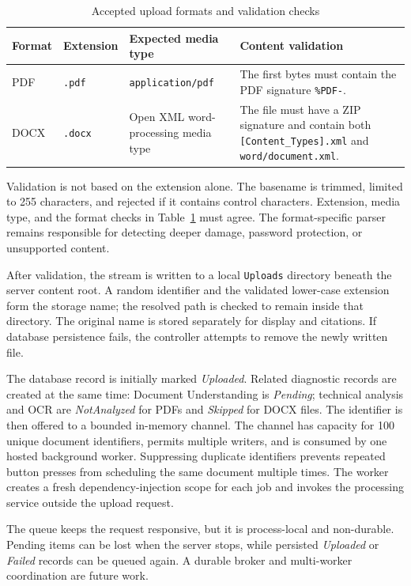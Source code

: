 \begin{table}[!htbp]
	\centering
	\small
	\caption{Accepted upload formats and validation checks}
	\label{tab:upload-formats}
	\begin{tabular}{@{}p{2.0cm}p{3.0cm}p{4.4cm}p{4.0cm}@{}}
		\toprule
		Format & Extension & Expected media type & Content validation \\
		\midrule
		PDF & \texttt{.pdf} & \texttt{application/pdf} & The first bytes must contain the PDF signature \texttt{\%PDF-}. \\
		DOCX & \texttt{.docx} & Open XML word-processing media type & The file must have a ZIP signature and contain both \texttt{[Content\_Types].xml} and \texttt{word/document.xml}. \\
		\bottomrule
	\end{tabular}
\end{table}

Validation is not based on the extension alone. The basename is trimmed,
limited to 255 characters, and rejected if it contains control characters.
Extension, media type, and the format checks in Table~\ref{tab:upload-formats}
must agree. The format-specific parser remains responsible for detecting
deeper damage, password protection, or unsupported content.

After validation, the stream is written to a local \texttt{Uploads} directory
beneath the server content root. A random identifier and the validated
lower-case extension form the storage name; the resolved path is checked to
remain inside that directory. The original name is stored separately for
display and citations. If database persistence fails, the controller attempts
to remove the newly written file.

The database record is initially marked \emph{Uploaded}. Related diagnostic
records are created at the same time: Document Understanding is \emph{Pending};
technical analysis and OCR are \emph{NotAnalyzed} for PDFs and \emph{Skipped}
for DOCX files. The identifier is then offered to a bounded in-memory channel.
The channel has capacity for 100 unique document identifiers, permits multiple
writers, and is consumed by one hosted background worker. Suppressing duplicate
identifiers prevents repeated button presses from scheduling the same document
multiple times. The worker creates a fresh dependency-injection scope for each
job and invokes the processing service outside the upload request.

The queue keeps the request responsive, but it is process-local and
non-durable. Pending items can be lost when the server stops, while persisted
\emph{Uploaded} or \emph{Failed} records can be queued again. A durable broker
and multi-worker coordination are future work.

